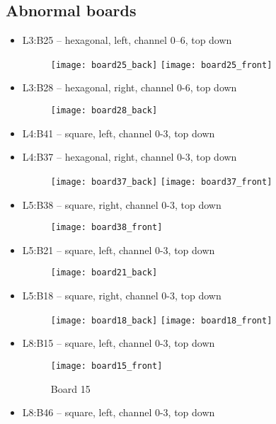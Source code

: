 \documentclass{report}
\begin{document}
\subsection{Abnormal boards}
\begin{itemize}
    \item L3:B25 -- hexagonal, left, channel 0--6, top down
	\begin{figure}[h]
	    \centering
	    \texttt{[image: board25\_back]}
	    \texttt{[image: board25\_front]}
	\end{figure}
    \item L3:B28 -- hexagonal, right, channel 0-6, top down
	\begin{figure}[h]
	    \centering
	    \texttt{[image: board28\_back]}
	\end{figure}
    \item L4:B41 -- square, left, channel 0-3, top down
    \item L4:B37 -- hexagonal, right, channel 0-3, top down
	\begin{figure}[h]
	    \centering
	    \texttt{[image: board37\_back]}
	    \texttt{[image: board37\_front]}
	\end{figure}
    \item L5:B38 -- square, right, channel 0-3, top down
	\begin{figure}[h]
	    \centering
	    \texttt{[image: board38\_front]}
	\end{figure}
    \item L5:B21 -- square, left, channel 0-3, top down
	\begin{figure}[h]
	    \centering
	    \texttt{[image: board21\_back]}
	\end{figure}
    \item L5:B18 -- square, right, channel 0-3, top down
	\begin{figure}[h]
	    \centering
	    \texttt{[image: board18\_back]}
	    \texttt{[image: board18\_front]}
	\end{figure}
    \item L8:B15 -- square, left, channel 0-3, top down
	\begin{figure}[h]
	    \centering
	    \texttt{[image: board15\_front]}
	    \caption{Board 15}
	\end{figure}
    \item L8:B46 -- square, left, channel 0-3, top down
	\begin{figure}[h]

\end{figure}
\end{itemize}
\end{document}

